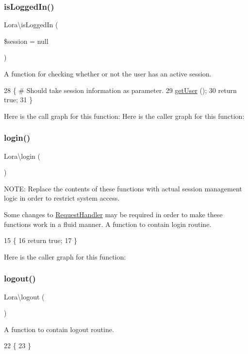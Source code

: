 \subsubsection{\texorpdfstring{is\+Logged\+In()}{isLoggedIn()}}
{\footnotesize\ttfamily Lora\textbackslash{}is\+Logged\+In (\begin{DoxyParamCaption}\item[{}]{\$session = {\ttfamily null} }\end{DoxyParamCaption})}

A function for checking whether or not the user has an active session. 
\begin{DoxyCode}
28                                       \{ # Should take session information as parameter.
29     \hyperlink{namespace_lora_a881d230aaa8a5510d5c80f0ed1497129}{getUser} ();
30     \textcolor{keywordflow}{return} \textcolor{keyword}{true};
31 \}
\end{DoxyCode}
Here is the call graph for this function\+:
Here is the caller graph for this function\+:
\mbox{\label{namespace_lora_a6334cdbb86812dbd18f093463e7c3023}} 
\subsubsection{\texorpdfstring{login()}{login()}}
{\footnotesize\ttfamily Lora\textbackslash{}login (\begin{DoxyParamCaption}{ }\end{DoxyParamCaption})}

N\+O\+TE\+: Replace the contents of these functions with actual session management logic in order to restrict system access.

Some changes to \hyperlink{class_lora_1_1_request_handler}{Request\+Handler} may be required in order to make these functions work in a fluid manner. A function to contain login routine. 
\begin{DoxyCode}
15                   \{
16     \textcolor{keywordflow}{return} \textcolor{keyword}{true};
17 \}
\end{DoxyCode}
Here is the caller graph for this function\+:
\mbox{\label{namespace_lora_a801b7854cd8f787f174a6b501bf517bb}} 
\subsubsection{\texorpdfstring{logout()}{logout()}}
{\footnotesize\ttfamily Lora\textbackslash{}logout (\begin{DoxyParamCaption}{ }\end{DoxyParamCaption})}

A function to contain logout routine. 
\begin{DoxyCode}
22                    \{
23 \}
\end{DoxyCode}
